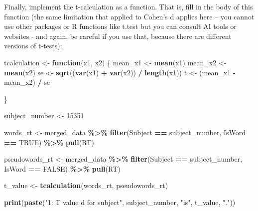 \documentclass[
]{article}
\newenvironment{Shaded}{\begin{snugshade}}{\end{snugshade}}
\newcommand{\ConstantTok}[1]{\textcolor[rgb]{0.56,0.35,0.01}{#1}}
\newcommand{\ControlFlowTok}[1]{\textcolor[rgb]{0.13,0.29,0.53}{\textbf{#1}}}
\newcommand{\DecValTok}[1]{\textcolor[rgb]{0.00,0.00,0.81}{#1}}
\newcommand{\FunctionTok}[1]{\textcolor[rgb]{0.13,0.29,0.53}{\textbf{#1}}}
\newcommand{\NormalTok}[1]{#1}
\newcommand{\OtherTok}[1]{\textcolor[rgb]{0.56,0.35,0.01}{#1}}
\newcommand{\SpecialCharTok}[1]{\textcolor[rgb]{0.81,0.36,0.00}{\textbf{#1}}}
\newcommand{\StringTok}[1]{\textcolor[rgb]{0.31,0.60,0.02}{#1}}
\begin{document}
Finally, implement the t-calculation as a function. That is, fill in the
body of this function (the same limitation that applied to Cohen's d
applies here -- you cannot use other packages or R functions like t.test
but you can consult AI tools or websites - and again, be careful if you
use that, because there are different versions of t-tests):

\begin{Shaded}
\begin{Highlighting}[]
\NormalTok{tcalculation }\OtherTok{\textless{}{-}} \ControlFlowTok{function}\NormalTok{(x1, x2) \{}
\NormalTok{  mean\_x1 }\OtherTok{\textless{}{-}} \FunctionTok{mean}\NormalTok{(x1)}
\NormalTok{  mean\_x2 }\OtherTok{\textless{}{-}} \FunctionTok{mean}\NormalTok{(x2)}
\NormalTok{  se }\OtherTok{\textless{}{-}} \FunctionTok{sqrt}\NormalTok{((}\FunctionTok{var}\NormalTok{(x1) }\SpecialCharTok{+} \FunctionTok{var}\NormalTok{(x2)) }\SpecialCharTok{/} \FunctionTok{length}\NormalTok{(x1))}
\NormalTok{  t }\OtherTok{\textless{}{-}}\NormalTok{ (mean\_x1 }\SpecialCharTok{{-}}\NormalTok{ mean\_x2) }\SpecialCharTok{/}\NormalTok{ se}

\NormalTok{\}}

\NormalTok{subject\_number }\OtherTok{\textless{}{-}} \DecValTok{15351}

\NormalTok{words\_rt }\OtherTok{\textless{}{-}}\NormalTok{ merged\_data }\SpecialCharTok{\%\textgreater{}\%}
  \FunctionTok{filter}\NormalTok{(Subject }\SpecialCharTok{==}\NormalTok{ subject\_number, IsWord }\SpecialCharTok{==} \ConstantTok{TRUE}\NormalTok{) }\SpecialCharTok{\%\textgreater{}\%}
  \FunctionTok{pull}\NormalTok{(RT)}

\NormalTok{pseudowords\_rt }\OtherTok{\textless{}{-}}\NormalTok{ merged\_data }\SpecialCharTok{\%\textgreater{}\%}
  \FunctionTok{filter}\NormalTok{(Subject }\SpecialCharTok{==}\NormalTok{ subject\_number, IsWord }\SpecialCharTok{==} \ConstantTok{FALSE}\NormalTok{) }\SpecialCharTok{\%\textgreater{}\%}
  \FunctionTok{pull}\NormalTok{(RT)}

\NormalTok{t\_value }\OtherTok{\textless{}{-}} \FunctionTok{tcalculation}\NormalTok{(words\_rt, pseudowords\_rt)}

\FunctionTok{print}\NormalTok{(}\FunctionTok{paste}\NormalTok{(}\StringTok{"1: T value d for subject"}\NormalTok{, subject\_number, }\StringTok{"is"}\NormalTok{, t\_value, }\StringTok{"."}\NormalTok{))}
\end{Highlighting}
\end{Shaded}
\end{document}
